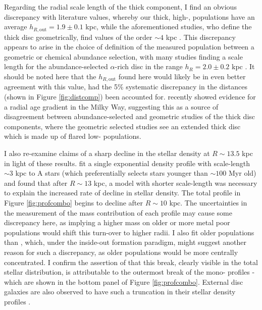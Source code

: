 Regarding the radial scale length of the thick component, I find an obvious discrepancy with literature values, whereby our thick, high-\afe{}, populations have an average $h_{R, \text{out}} = 1.9 \pm 0.1  $ kpc, while the aforementioned studies, who define the thick disc geometrically, find values of the order $\sim 4$ kpc \citep{2001MNRAS.322..426O,2008ApJ...673..864J}. This discrepancy appears to arise in the choice of definition of the measured population between a geometric or chemical abundance selection, with many studies finding a scale length for the abundance-selected $\alpha$-rich disc in the range $h_R = 2.0 \pm 0.2$ kpc \citep{2016ARA&A..54..529B,2016ApJ...823...30B,2012ApJ...753..148B,2012ApJ...752...51C}. It should be noted here that the $h_{R, \text{out}}$ found here would likely be in even better agreement with this value, had the 5\% systematic discrepancy in the distances (shown in Figure \ref{fig:distcomp}) been accounted for. \citet{2016arXiv160901168M} recently showed evidence for a radial age gradient in the Milky Way, suggesting this as a source of disagreement between abundance-selected and geometric studies of the thick disc components, where the geometric selected studies see an extended thick disc which is made up of flared low-\afe{} populations. 

I also re-examine claims of a sharp decline in the stellar density at $R\sim 13.5$ kpc \citep[e.g.][]{2009A&A...495..819R,2010MNRAS.402..713S} in light of these results. \citet{2010MNRAS.402..713S} fit a single exponential density profile with scale-length $\sim 3$ kpc to A stars (which preferentially selects stars younger than $\sim 100$ Myr old) and found that after $R\sim13$ kpc, a model with shorter scale-length was necessary to explain the increased rate of decline in stellar density. The total profile in Figure \ref{fig:profcombo} begins to decline after $R\sim10$ kpc. The uncertainties in the measurement of the mass contribution of each profile may cause some discrepancy here, as implying a higher mass on older or more metal poor populations would shift this turn-over to higher radii. I also fit older populations than \citet{2010MNRAS.402..713S}, which, under the inside-out formation paradigm, might suggest another reason for such a discrepancy, as older populations would be more centrally concentrated. I confirm the assertion of \citet{2016ApJ...823...30B} that this break, clearly visible in the total stellar distribution, is attributable to the outermost break of the mono-\feh{} profiles - which are shown in the bottom panel of Figure \ref{fig:profcombo}. External disc galaxies are also observed to have such a truncation in their stellar density profiles \citep[e.g.][]{2006A&A...454..759P}. 


